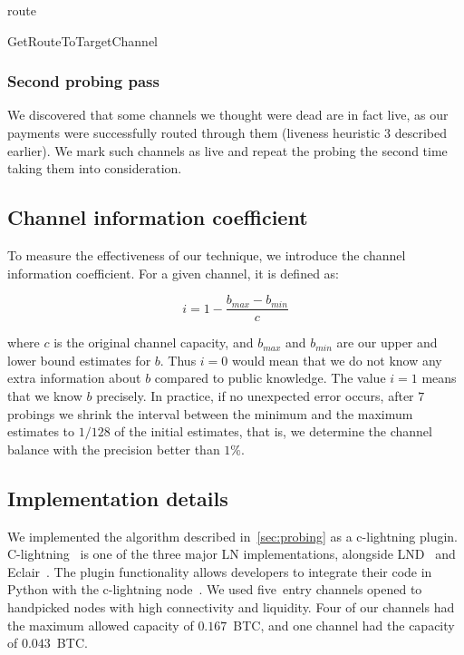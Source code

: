 \begin{algorithm}
	 {
	}
	\Return route\;
	\caption{GetRouteToTargetChannel}
	\label{alg:find-route}
\end{algorithm}

\subsubsection{Second probing pass}
We discovered that some channels we thought were dead are in fact live, as our payments were successfully routed through them (liveness heuristic 3 described earlier).
We mark such channels as live and repeat the probing the second time taking them into consideration.

\subsection{Channel information coefficient}
To measure the effectiveness of our technique, we introduce the channel information coefficient.
For a given channel, it is defined as:

\[i = 1 - \frac{b_{max} - b_{min}}{c}\]

where $c$ is the original channel capacity, and $b_{max}$ and $b_{min}$ are our upper and lower bound estimates for $b$.
Thus $i=0$ would mean that we do not know any extra information about $b$ compared to public knowledge.
The value $i=1$ means that we know $b$ precisely.
In practice, if no unexpected error occurs, after $7$ probings we shrink the interval between the minimum and the maximum estimates to $1/128$ of the initial estimates, that is, we determine the channel balance with the precision better than $1\%$.


\subsection{Implementation details}

We implemented the algorithm described in~\cref{sec:probing} as a c-lightning plugin.
C-lightning~\cite{clightning} is one of the three major LN implementations, alongside LND~\cite{LND} and Eclair~\cite{Eclair}.
The plugin functionality allows developers to integrate their code in Python with the c-lightning node~\cite{clightningPlugins}.
We used five~entry channels opened to handpicked nodes with high connectivity and liquidity.
Four of our channels had the maximum allowed capacity of $0.167$~BTC, and one channel had the capacity of $0.043$~BTC.

